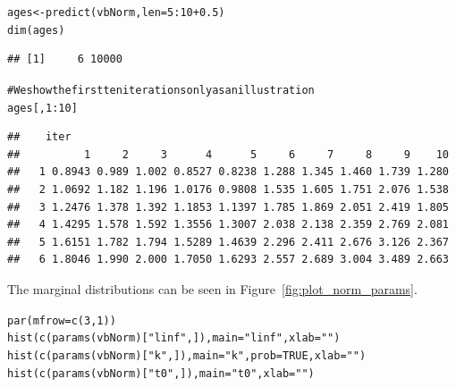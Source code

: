 \documentclass[a4paper,english,10pt]{article}\usepackage[]{graphicx}\usepackage[]{color}
\makeatletter
\newcommand{\hlnum}[1]{\textcolor[rgb]{0.2,0.2,0.2}{#1}}%
\newcommand{\hlstr}[1]{\textcolor[rgb]{0.2,0.2,0.2}{#1}}%
\newcommand{\hlcom}[1]{\textcolor[rgb]{0.2,0.267,0.4}{#1}}%
\newcommand{\hlopt}[1]{\textcolor[rgb]{0.2,0.2,0.2}{#1}}%
\newcommand{\hlstd}[1]{\textcolor[rgb]{0,0,0}{#1}}%
\newcommand{\hlkwb}[1]{\textcolor[rgb]{0.361,0.506,0.596}{#1}}%
\newcommand{\hlkwc}[1]{\textcolor[rgb]{0.361,0.506,0.596}{#1}}%
\newcommand{\hlkwd}[1]{\textcolor[rgb]{0.361,0.506,0.596}{#1}}%
\newenvironment{kframe}{%
 \def\at@end@of@kframe{}%
 \ifinner\ifhmode%
  \def\at@end@of@kframe{\end{minipage}}%
  \begin{minipage}{\columnwidth}%
 \fi\fi%
 \def\FrameCommand##1{\hskip\@totalleftmargin \hskip-\fboxsep
 \colorbox{shadecolor}{##1}\hskip-\fboxsep
     \hskip-\linewidth \hskip-\@totalleftmargin \hskip\columnwidth}%
 \MakeFramed {\advance\hsize-\width
   \@totalleftmargin\z@ \linewidth\hsize
   \@setminipage}}%
 {\par\unskip\endMakeFramed%
 \at@end@of@kframe}
\newenvironment{knitrout}{}{} %
\makeatother
\begin{document}
\begin{knitrout}
\color{fgcolor}\begin{kframe}
\begin{alltt}
\hlstd{ages} \hlkwb{<-} \hlkwd{predict}\hlstd{(vbNorm,} \hlkwc{len} \hlstd{=} \hlnum{5}\hlopt{:}\hlnum{10} \hlopt{+} \hlnum{0.5}\hlstd{)}
\hlkwd{dim}\hlstd{(ages)}
\end{alltt}
\begin{verbatim}
## [1]     6 10000
\end{verbatim}
\begin{alltt}
\hlcom{# We show the first ten iterations only as an illustration}
\hlstd{ages[,} \hlnum{1}\hlopt{:}\hlnum{10}\hlstd{]}
\end{alltt}
\begin{verbatim}
##    iter
##          1     2     3      4      5     6     7     8     9    10
##   1 0.8943 0.989 1.002 0.8527 0.8238 1.288 1.345 1.460 1.739 1.280
##   2 1.0692 1.182 1.196 1.0176 0.9808 1.535 1.605 1.751 2.076 1.538
##   3 1.2476 1.378 1.392 1.1853 1.1397 1.785 1.869 2.051 2.419 1.805
##   4 1.4295 1.578 1.592 1.3556 1.3007 2.038 2.138 2.359 2.769 2.081
##   5 1.6151 1.782 1.794 1.5289 1.4639 2.296 2.411 2.676 3.126 2.367
##   6 1.8046 1.990 2.000 1.7050 1.6293 2.557 2.689 3.004 3.489 2.663
\end{verbatim}
\end{kframe}
\end{knitrout}


The marginal distributions can be seen in Figure~\ref{fig:plot_norm_params}.
\begin{knitrout}
\color{fgcolor}\begin{kframe}
\begin{alltt}
\hlkwd{par}\hlstd{(}\hlkwc{mfrow} \hlstd{=} \hlkwd{c}\hlstd{(}\hlnum{3}\hlstd{,} \hlnum{1}\hlstd{))}
\hlkwd{hist}\hlstd{(}\hlkwd{c}\hlstd{(}\hlkwd{params}\hlstd{(vbNorm)[}\hlstr{"linf"}\hlstd{, ]),} \hlkwc{main} \hlstd{=} \hlstr{"linf"}\hlstd{,} \hlkwc{xlab} \hlstd{=} \hlstr{""}\hlstd{)}
\hlkwd{hist}\hlstd{(}\hlkwd{c}\hlstd{(}\hlkwd{params}\hlstd{(vbNorm)[}\hlstr{"k"}\hlstd{, ]),} \hlkwc{main} \hlstd{=} \hlstr{"k"}\hlstd{,} \hlkwc{prob} \hlstd{=} \hlnum{TRUE}\hlstd{,} \hlkwc{xlab} \hlstd{=} \hlstr{""}\hlstd{)}
\hlkwd{hist}\hlstd{(}\hlkwd{c}\hlstd{(}\hlkwd{params}\hlstd{(vbNorm)[}\hlstr{"t0"}\hlstd{, ]),} \hlkwc{main} \hlstd{=} \hlstr{"t0"}\hlstd{,} \hlkwc{xlab} \hlstd{=} \hlstr{""}\hlstd{)}
\end{alltt}
\end{kframe}
\end{knitrout}
\end{document}
